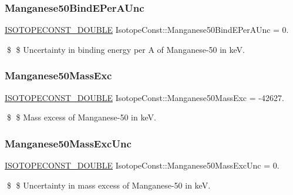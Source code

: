 \subsubsection{\texorpdfstring{Manganese50\+Bind\+E\+Per\+A\+Unc}{Manganese50BindEPerAUnc}}
{\footnotesize\ttfamily \mbox{\hyperlink{group___isotope_const-_macros_ga8f45a7272ce02c0b4c65c44636ed719a}{I\+S\+O\+T\+O\+P\+E\+C\+O\+N\+S\+T\+\_\+\+D\+O\+U\+B\+LE}} Isotope\+Const\+::\+Manganese50\+Bind\+E\+Per\+A\+Unc = 0.}

\$ \$ Uncertainty in binding energy per A of Manganese-\/50 in keV. \mbox{\label{group___isotope_const-_manganese-_mn50_gaae8d5defc72a413f14c571dd4bd60a09}} 
\subsubsection{\texorpdfstring{Manganese50\+Mass\+Exc}{Manganese50MassExc}}
{\footnotesize\ttfamily \mbox{\hyperlink{group___isotope_const-_macros_ga8f45a7272ce02c0b4c65c44636ed719a}{I\+S\+O\+T\+O\+P\+E\+C\+O\+N\+S\+T\+\_\+\+D\+O\+U\+B\+LE}} Isotope\+Const\+::\+Manganese50\+Mass\+Exc = -\/42627.}

\$ \$ Mass excess of Manganese-\/50 in keV. \mbox{\label{group___isotope_const-_manganese-_mn50_gad6ede56329f652c01956f75126436e56}} 
\subsubsection{\texorpdfstring{Manganese50\+Mass\+Exc\+Unc}{Manganese50MassExcUnc}}
{\footnotesize\ttfamily \mbox{\hyperlink{group___isotope_const-_macros_ga8f45a7272ce02c0b4c65c44636ed719a}{I\+S\+O\+T\+O\+P\+E\+C\+O\+N\+S\+T\+\_\+\+D\+O\+U\+B\+LE}} Isotope\+Const\+::\+Manganese50\+Mass\+Exc\+Unc = 0.}

\$ \$ Uncertainty in mass excess of Manganese-\/50 in keV. \mbox{\label{group___isotope_const-_manganese-_mn50_ga362e8022b82bdbc47d024c33482d7353}} 
